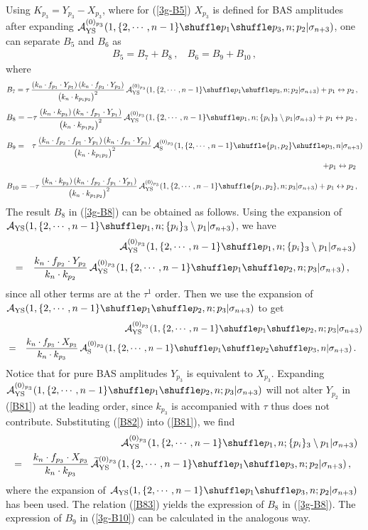 \documentclass[preprint,showpacs,onecolumn,nofootinbib]{revtex4}
\newcommand{\bea}{\begin{eqnarray}}
\newcommand{\eea}{\end{eqnarray}}
\newcommand{\nn}{\nonumber \\}
\def\W #1{\widetilde{#1}}
\def\eref#1{(\ref{#1})}
\begin{document}
Using $K_{p_3}=Y_{p_3}-X_{p_3}$, where for \eref{3g-B5} $X_{p_3}$ is defined for BAS amplitudes after expanding ${\cal A}^{(0)_{p_3}}_{\rm YS}(1,\{2,\cdots,n-1\}\shuffle p_1\shuffle p_3,n;p_2|\sigma_{n+3})$, one can separate $B_5$ and $B_6$ as
%
\bea
B_5=B_7+B_8\,,~~~~B_6=B_9+B_{10}\,,
\eea
%
where
%
\bea
B_7=\tau\,{(k_n\cdot f_{p_1}\cdot Y_{p_1})\,(k_n\cdot f_{p_3}\cdot Y_{p_3})\over \big(k_n\cdot k_{p_1p_2}\big)^2}\,{\cal A}^{(0)_{p_3}}_{\rm YS}(1,\{2,\cdots,n-1\}\shuffle p_1\shuffle p_3,n;p_2|\sigma_{n+3})+p_1\leftrightarrow p_2\,,~~\label{3g-B7}
\eea
%
%
\bea
B_8=-\tau\,{(k_n\cdot k_{p_3})\,(k_n\cdot f_{p_1}\cdot Y_{p_1})\over \big(k_n\cdot k_{p_1p_2}\big)^2}\,{\cal A}^{(0)_{p_3}}_{\rm YS}(1,\{2,\cdots,n-1\}\shuffle p_1,n;\{p_i\}_3\setminus p_1|\sigma_{n+3})+p_1\leftrightarrow p_2\,,~~\label{3g-B8}
\eea
%
%
\bea
B_9&=&\tau\,{(k_n\cdot f_{p_2}\cdot f_{p_1}\cdot Y_{p_1})\,(k_n\cdot f_{p_3}\cdot Y_{p_3})\over \big(k_n\cdot k_{p_1p_2}\big)^2}\,{\cal A}^{(0)_{p_3}}_{\rm S}(1,\{2,\cdots,n-1\}\shuffle \{p_1,p_2\}\shuffle p_3,n|\sigma_{n+3})\nn
& &+p_1\leftrightarrow p_2\,~~\label{3g-B9}
\eea
%
%
\bea
B_{10}=-\tau\,{(k_n\cdot k_{p_3})\,(k_n\cdot f_{p_2}\cdot f_{p_1}\cdot Y_{p_1})\over \big(k_n\cdot k_{p_1p_2}\big)^2}\,{\cal A}^{(0)_{p_3}}_{\rm YS}(1,\{2,\cdots,n-1\}\shuffle \{p_1,p_2\},n;p_3|\sigma_{n+3})+p_1\leftrightarrow p_2\,,~~\label{3g-B10}
\eea
%
The result $B_8$ in \eref{3g-B8} can be obtained as follows. Using the expansion of ${\cal A}_{\rm YS}(1,\{2,\cdots,n-1\}\shuffle p_1,n;\{p_i\}_3\setminus p_1|\sigma_{n+3})$, we have
%
\bea
& &{\cal A}^{(0)_{p_3}}_{\rm YS}(1,\{2,\cdots,n-1\}\shuffle p_1,n;\{p_i\}_3\setminus p_1|\sigma_{n+3})\nn
&=&{k_n\cdot f_{p_2}\cdot Y_{p_2}\over k_n\cdot k_{p_2}}\,{\cal A}^{(0)_{p_3}}_{\rm YS}(1,\{2,\cdots,n-1\}\shuffle p_1\shuffle p_2,n;p_3|\sigma_{n+3})\,,~~\label{B81}
\eea
%
since all other terms are at the $\tau^1$ order. Then we use the expansion of ${\cal A}_{\rm YS}(1,\{2,\cdots,n-1\}\shuffle p_1\shuffle p_2,n;p_3|\sigma_{n+3})$ to get
%
\bea
& &{\cal A}^{(0)_{p_3}}_{\rm YS}(1,\{2,\cdots,n-1\}\shuffle p_1\shuffle p_2,n;p_3|\sigma_{n+3})\nn
&=&{k_n\cdot f_{p_3}\cdot X_{p_3}\over k_n\cdot k_{p_3}}\,{\cal A}^{(0)_{p_3}}_{\rm S}(1,\{2,\cdots,n-1\}\shuffle p_1\shuffle p_2\shuffle p_3,n|\sigma_{n+3})\,.~~\label{B82}
\eea
%
Notice that for pure BAS amplitudes $Y_{p_3}$ is equivalent to $X_{p_3}$. Expanding ${\cal A}^{(0)_{p_3}}_{\rm YS}(1,\{2,\cdots,n-1\}\shuffle p_1\shuffle p_2,n;p_3|\sigma_{n+3})$ will not alter $Y_{p_2}$ in \eref{B81} at the leading order, since $k_{p_3}$
is accompanied with $\tau$ thus does not contribute. Substituting \eref{B82} into \eref{B81}, we find
%
\bea
& &{\cal A}^{(0)_{p_3}}_{\rm YS}(1,\{2,\cdots,n-1\}\shuffle p_1,n;\{p_i\}_3\setminus p_1|\sigma_{n+3})\nn
&=&{k_n\cdot f_{p_3}\cdot X_{p_3}\over k_n\cdot k_{p_3}}\,\W{\cal A}^{(0)_{p_3}}_{\rm YS}(1,\{2,\cdots,n-1\}\shuffle p_1\shuffle p_3,n;p_2|\sigma_{n+3})\,,~~\label{B83}
\eea
%
where the expansion of ${\cal A}_{\rm YS}(1,\{2,\cdots,n-1\}\shuffle p_1\shuffle p_3,n;p_2|\sigma_{n+3})$ has been used. The relation \eref{B83} yields the expression of $B_8$ in \eref{3g-B8}. The expression of $B_9$ in \eref{3g-B10} can be calculated in the analogous way.
\end{document}
